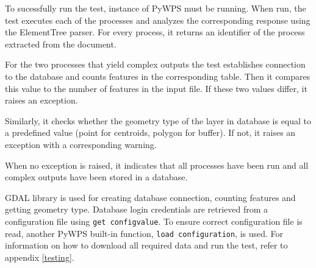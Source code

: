 To sucessfully run the test, instance of PyWPS must be running. When
run, the test executes each of the processes and analyzes the
corresponding  response using the ElementTree 
parser. For every process, it returns an identifier of the process
extracted from the  document.

For the two processes that yield complex outputs the test establishes
connection to the database and counts features in the corresponding
table. Then it compares this value to the number of features in the
input file. If these two values differ, it raises an exception.

Similarly, it checks whether the geometry type of the layer in
database is equal to a predefined value (point for centroids, polygon
for buffer). If not, it raises an exception with a corresponding
warning.

When no exception is raised, it indicates that all processes have been
run and all complex outputs have been stored in a database.

GDAL library is used for creating database connection, counting
features and getting geometry type. Database login credentials are
retrieved from a configuration file using \texttt{get\textunderscore
  config\textunderscore value}. To ensure correct configuration file
is read, another PyWPS built-in function, \texttt{load\textunderscore
  configuration}, is used.
For information on how to download all required data and run the test,
refer to appendix \ref{testing}.


